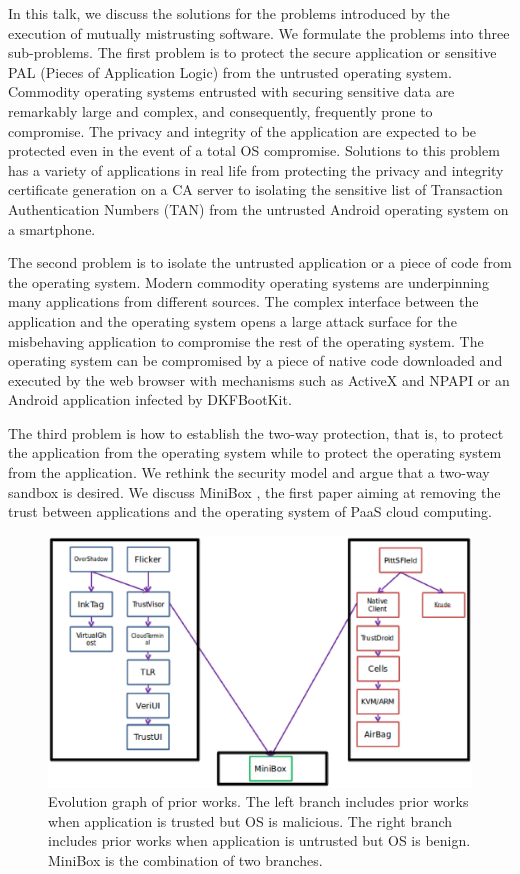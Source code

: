 In this talk, we discuss the solutions for the problems introduced by the
execution of mutually mistrusting software. We formulate the problems into three
sub-problems. The first problem is to protect the secure application or
sensitive PAL (Pieces of Application Logic) from the untrusted operating system.
Commodity operating systems entrusted with securing sensitive data are
remarkably large and complex, and consequently, frequently prone to compromise.
The privacy and integrity of the application are expected to be protected even
in the event of a total OS compromise. Solutions to this problem has a variety
of applications in real life from protecting the privacy and integrity
certificate generation on a CA server to isolating the sensitive list of
Transaction Authentication Numbers (TAN) from the untrusted Android operating
system on a smartphone.

The second problem is to isolate the untrusted application or a piece of code
from the operating system. Modern commodity operating systems are underpinning
many applications from different sources. The complex interface between the
application and the operating system opens a large attack surface for the
misbehaving application to compromise the rest of the operating system. The
operating system can be compromised by a piece of native code downloaded and
executed by the web browser with mechanisms such as ActiveX and NPAPI or an
Android application infected by DKFBootKit.

The third problem is how to establish the two-way protection, that is, to
protect the application from the operating system while to protect the operating
system from the application. We rethink the security model and argue that a
two-way sandbox is desired.  We discuss MiniBox \cite{MiniBox}, the first paper
aiming at removing the trust between applications and the operating system of
PaaS cloud computing.

\begin{figure}[htb]
\centering
\includegraphics[width=\columnwidth]{figures/evolution.eps}
\caption{Evolution graph of prior works. The left branch includes prior works
when application is trusted but OS is malicious. The right branch includes prior
works when application is untrusted but OS is benign. MiniBox is the combination
of two branches.}
\label{fig:evolution}
\end{figure}

